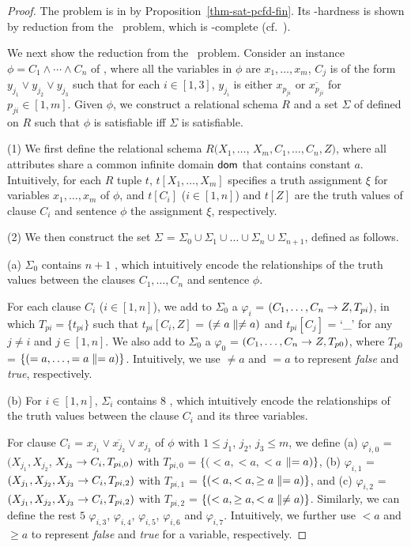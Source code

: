 \begin{proof} The problem is in \NP by
Proposition~\ref{thm-sat-pcfd-fin}. Its \NP-hardness is shown by
reduction from the \kSAT\ problem, which is \NP-complete
(cf.~\cite{GaJo79}). 

We next show the reduction from the \kSAT\ problem. Consider an instance $\phi = C_1 \land \cdots
\land C_n$ of \kSAT, where all the variables in $\phi$ are $x_1,
\ldots, x_m$, $C_j$ is of the form $y_{j_1} \lor y_{j_2} \lor
y_{j_3}$ such that for each $i\in[1,3]$, $y_{j_i}$ is either
$x_{p_{ji}}$ or $\overline{x_{p_{ji}}}$ for $p_{ji} \in [1, m]$.
Given $\phi$, we construct a relational schema $R$ and a set $\Sigma$
of \pCFDs defined on $R$ such that $\phi$ is satisfiable iff
$\Sigma$ is satisfiable.

\sstab (1) We first define the relational schema $R$$(X_1, \ldots$, $X_m, C_1, \ldots,
C_n, Z)$, where all attributes share a common infinite domain $\protect\mathsf{dom}$ that contains constant $a$. 
Intuitively, for each $R$ tuple $t$, $t[X_1, \ldots, X_m]$ specifies a truth assignment $\xi$ for variables
$x_1, \ldots, x_m$ of $\phi$, and $t[C_i]$ ($i\in[1, n]$) and $t[Z]$ are the truth
values of clause $C_i$ and sentence $\phi$ \wrt the assignment $\xi$, respectively.

\sstab (2) We then construct the set \pCFDs $\Sigma$ =
$\Sigma_0\cup\Sigma_1\cup\ldots\cup\Sigma_n\cup\Sigma_{n+1}$, defined as follows.

\bi
\item[(a)] $\Sigma_0$ contains $n + 1$ \pCFDs, which intuitively
encode the relationships of the truth values  between the clauses $C_1,
\ldots, C_n$ and  sentence $\phi$.

For each clause $C_i$ ($i\in[1, n]$), we add to $\Sigma_0$ a \pCFD $\varphi_i$ =
$(C_1,\ldots, C_n\rightarrow Z, T_{pi})$, in which $T_{pi} = \{t_{pi}\}$ such that
$t_{pi}[C_i,Z]$ = $(\ne a \parallel \ne a)$ and $t_{pi}[C_j]$ = `\_'
for any $j\ne i$ and $j\in[1, n]$. We also add to $\Sigma_0$ a \pCFD $\varphi_{0}$ =
$(C_1,\ldots, C_n\rightarrow Z, T_{p0})$, where $T_{p0}$ = $\{(= a, \ldots,
=a \parallel = a)\}$. Intuitively, we use $\ne a$ and $= a$ to represent
{\em false} and {\em true}, respectively.

\item[(b)]  For $i\in[1, n]$, $\Sigma_i$ contains $8$ \pCFDs, which intuitively
encode the relationships of the truth values between the clause $C_i$ and its three
variables.

For clause $C_i$ = $x_{j_1} \lor \overline{x_{j_2}} \lor
x_{j_3}$ of $\phi$ with $1\le j_1$, $j_2$, $j_3 \le m$, we define
\pCFDs 
(a) $\varphi_{i,0}$ = $(X_{j_1}, X_{j_2}$, $X_{j_3}\rightarrow C_i, T_{pi,0})$ with $T_{pi,0}$ = $\{(< a, < a, <a$ $\parallel = a)\}$, 
(b) $\varphi_{i,1}$ = $(X_{j_1},X_{j_2},X_{j_3}\rightarrow C_i, T_{pi,2})$ with $T_{pi,1}$ = $\{(< a, <a, \ge  a \parallel =a)\}$,  and 
(c) $\varphi_{i,2}$ = $(X_{j_1},X_{j_2},X_{j_3}\rightarrow C_i, T_{pi,2})$ with $T_{pi,2}$ = $\{(< a, \ge a, < a \parallel \ne a)\}$. 
Similarly, we can define the rest $5$ \pCFDs $\varphi_{i,3}$, $\varphi_{i,4}$,
$\varphi_{i,5}$, $\varphi_{i,6}$ and $\varphi_{i,7}$. Intuitively,
we further use $<a$ and $\ge a$ to represent {\em false} and {\em true} for
a variable, respectively.


\end{proof}
